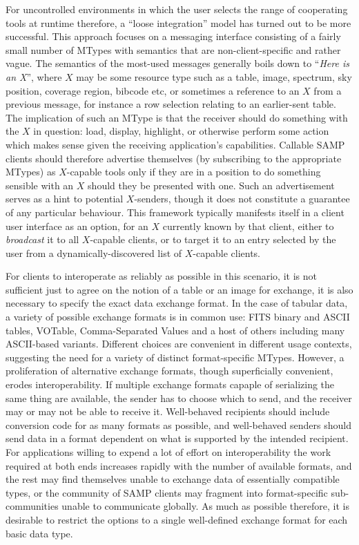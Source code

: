 \documentclass[5p]{elsarticle}
\begin{document}
For uncontrolled environments in which the user selects
the range of cooperating tools at runtime therefore,
a ``loose integration'' model has turned out to be more successful.
This approach focuses on a messaging interface
consisting of a fairly small number of MTypes with
semantics that are non-client-specific and rather vague.
The semantics of the most-used messages generally boils down to
``{\em Here is an X}'', where $X$ may be some resource type such as a
table, image, spectrum,
sky position, coverage region, bibcode etc,
or sometimes a reference to an $X$ from a previous message,
for instance a row selection relating to an earlier-sent table.
The implication of such an MType is that the receiver should do
something with the $X$ in question: load, display, highlight,
or otherwise perform some action which makes sense given the
receiving application's capabilities.
Callable SAMP clients should therefore advertise themselves
(by subscribing to the appropriate MTypes) as $X$-capable
tools only if they are in a position to do something sensible
with an $X$ should they be presented with one.
Such an advertisement serves as a hint to potential $X$-senders,
though it does not constitute a guarantee of any particular behaviour.
This framework typically manifests itself in a client user interface
as an option, for an $X$ currently known by that client,
either to {\em broadcast\/} it to all $X$-capable clients,
or to target it to an entry selected by the user
from a dynamically-discovered list of $X$-capable clients.

For clients to interoperate as reliably as possible in this scenario,
it is not sufficient just to agree on the notion of a table or an image
for exchange, it is also necessary to specify the exact data exchange
format.
In the case of tabular data, a variety of possible exchange formats
is in common use: FITS binary and ASCII tables, VOTable,
Comma-Separated Values and a host of others including 
many ASCII-based variants.  Different choices are convenient in
different usage contexts, suggesting the need for a variety of
distinct format-specific MTypes.
However, a proliferation of alternative exchange formats,
though superficially convenient, erodes interoperability.
If multiple exchange formats capaple of serializing the same thing
are available,
the sender has to choose which to send, and the receiver may or
may not be able to receive it.
Well-behaved recipients should include conversion code for as many
formats as possible, and well-behaved senders should send data
in a format dependent on what is supported by the intended recipient.
For applications willing to expend a lot of effort on interoperability 
the work required at both ends increases rapidly with the number of
available formats, and the rest may find themselves unable to
exchange data of essentially compatible types,
or the community of SAMP clients may fragment into format-specific
sub-communities unable to communicate globally.
As much as possible therefore, it is desirable to restrict the options
to a single well-defined exchange format for each basic data type.
\end{document}

